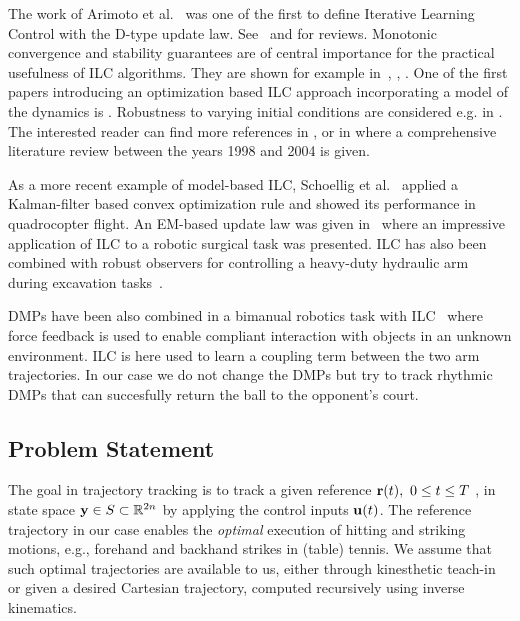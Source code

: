 
The work of Arimoto et al.~\cite{Arimoto84} was one of the first to define Iterative Learning Control with the D-type update law. See~\cite{Bristow06} and \cite{Moore07} for reviews. Monotonic convergence and stability guarantees are of central importance for the practical usefulness of ILC algorithms. They are shown for example in~\cite{Bristow06}, \cite{Norrloef02}, \cite{Longman2000}. One of the first papers introducing an optimization based ILC approach incorporating a model of the dynamics is \cite{Amann95}. Robustness to varying initial conditions are considered e.g. in \cite{Hillenbrand00}. The interested reader can find more references in \cite{Bristow06}, or in \cite{Moore07} where a comprehensive literature review between the years 1998 and 2004 is given.

As a more recent example of model-based ILC, Schoellig et al.~\cite{Schoellig12} applied a Kalman-filter based convex optimization rule and showed its performance in quadrocopter flight. An EM-based update law was given in~\cite{Berg10} where an impressive application of ILC to a robotic surgical task was presented. 
ILC has also been combined with robust observers for controlling a heavy-duty hydraulic arm during excavation tasks~\cite{Maeda2015Combined}. 

DMPs have been also combined in a bimanual robotics task with ILC~\cite{Gams13} where force feedback is used to enable compliant interaction with objects in an unknown environment. ILC is here used to learn a coupling term between the two arm trajectories. In our case we do not change the DMPs but try to track rhythmic DMPs that can succesfully return the ball to the opponent's court.

\subsection{Problem Statement}\label{problemStatement}

The goal in trajectory tracking is to track a given reference $\boldsymbol{\mathrm{r}}(t), \ 0 \leq t \leq T \ $, in state space $\boldsymbol{\mathrm{y}} \in S \subset \mathbb{R}^{2n}$ by applying the control inputs $\boldsymbol{\mathrm{u}}(t)$. The reference trajectory in our case enables the \emph{optimal} execution of hitting and striking motions, e.g., forehand and backhand strikes in (table) tennis. We assume that such optimal trajectories are available to us, either through kinesthetic teach-in or given a desired Cartesian trajectory, computed recursively using inverse kinematics.


